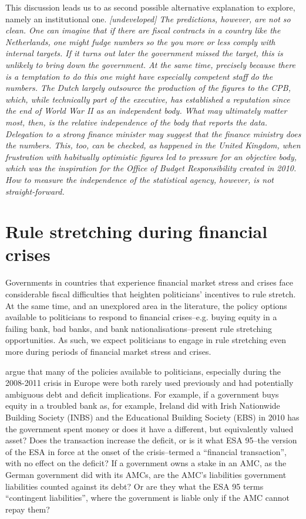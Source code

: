 \documentclass[]{article}
\begin{document}
This discussion leads us to as second possible alternative explanation to explore, namely an  institutional one. \emph{[undeveloped]  The predictions, however, are not so clean. One can imagine that if there are fiscal contracts in a country like the Netherlands, one might fudge numbers so the you more or less comply with internal targets. If it turns out later the government missed the target, this is unlikely to bring down the government. At the same time, precisely because  there is a temptation to do this one might have especially competent staff do the numbers. The Dutch largely outsource the production of the figures to the CPB, which, while technically part of the executive, has established a reputation since the end of World War II as an independent body. What may ultimately matter most, then, is the relative independence of the body that reports the data. Delegation to a strong finance minister may suggest that the finance ministry does the numbers. This, too, can be checked, as happened in the United Kingdom, when frustration with habitually optimistic figures led to pressure for an objective body, which was the inspiration for the Office of Budget Responsibility created in 2010. How to measure the independence of the statistical agency, however, is not straight-forward.}

\section{Rule stretching during financial crises}

Governments in countries that experience financial market stress and crises face considerable fiscal difficulties \cite[see][]{Laeven2012} that heighten politicians' incentives to rule stretch. At the same time, and an unexplored area in the literature, the policy options available to politicians to respond to financial crises--e.g. buying equity in a failing bank, bad banks, and bank nationalisations--present rule stretching opportunities. As such, we expect politicians to engage in rule stretching even more during periods of financial market stress and crises.

\cite{GandrudHallerberg2016} argue that many of the policies available to politicians, especially during the 2008-2011 crisis in Europe were both rarely used previously and had potentially ambiguous debt and deficit implications. For example, if a government buys equity in a troubled bank as, for example, Ireland did with Irish Nationwide Building Society (INBS) and the Educational Building Society (EBS) in 2010 has the government spent money or does it have a different, but equivalently valued asset? Does the transaction increase the deficit, or is it what ESA 95--the version of the ESA in force at the onset of the crisis--termed a ``financial transaction'', with no effect on the deficit? If a government owns a stake in an AMC, as the German government did with its AMCs, are the AMC's liabilities government liabilities counted against its debt? Or are they what the ESA 95 terms ``contingent liabilities'', where the government is liable only if the AMC cannot repay them?
\end{document}
